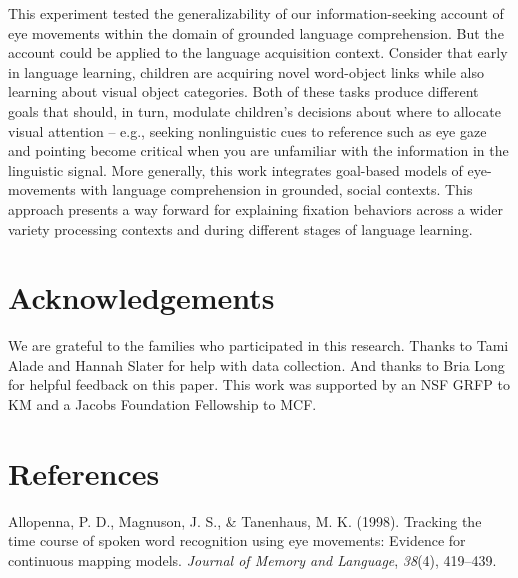 \documentclass[10pt, letterpaper]{article}
\begin{document}
This experiment tested the generalizability of our information-seeking
account of eye movements within the domain of grounded language
comprehension. But the account could be applied to the language
acquisition context. Consider that early in language learning, children
are acquiring novel word-object links while also learning about visual
object categories. Both of these tasks produce different goals that
should, in turn, modulate children's decisions about where to allocate
visual attention -- e.g., seeking nonlinguistic cues to reference such
as eye gaze and pointing become critical when you are unfamiliar with
the information in the linguistic signal. More generally, this work
integrates goal-based models of eye-movements with language
comprehension in grounded, social contexts. This approach presents a way
forward for explaining fixation behaviors across a wider variety
processing contexts and during different stages of language learning.

\vspace{1em}

\vspace{1em}

\hypertarget{acknowledgements}{%
\section{Acknowledgements}\label{acknowledgements}}

We are grateful to the families who participated in this research.
Thanks to Tami Alade and Hannah Slater for help with data collection.
And thanks to Bria Long for helpful feedback on this paper. This work
was supported by an NSF GRFP to KM and a Jacobs Foundation Fellowship to
MCF.

\hypertarget{references}{%
\section{References}\label{references}}

\setlength{\parindent}{-0.1in} 
\setlength{\leftskip}{0.125in}

\noindent

\hypertarget{refs}{}
\leavevmode\hypertarget{ref-allopenna1998tracking}{}%
Allopenna, P. D., Magnuson, J. S., \& Tanenhaus, M. K. (1998). Tracking
the time course of spoken word recognition using eye movements: Evidence
for continuous mapping models. \emph{Journal of Memory and Language},
\emph{38}(4), 419--439.
\end{document}
